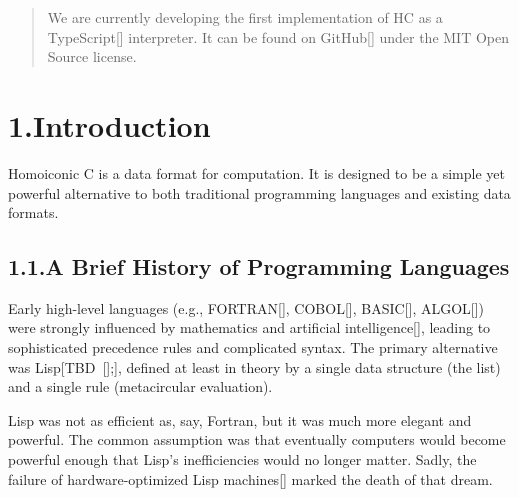 \documentclass[preprint]{{acmart}}
\begin{document}
\begin{abstract}
We are currently developing the first implementation of HC as a
TypeScript[] interpreter. It can be found on GitHub[]
under the MIT Open Source license.%
\end{abstract}%

\section{1.\hspace*{0.5em}Introduction}\label{sec-intro}%

\noindent{}Homoiconic C is a data format for computation. It is designed to be a
simple yet powerful alternative to both traditional programming languages
and existing data formats.%

\subsection{1.1.\hspace*{0.5em}A Brief History of Programming Languages}\label{sec-a-brief-history-of-programming-languages}%

\noindent{}Early high-level languages (e.g., FORTRAN[], COBOL[],
BASIC[], ALGOL[]) were strongly influenced by mathematics and
artificial intelligence[], leading to sophisticated precedence rules
and complicated syntax. The primary alternative was Lisp[TBD~{}[];], defined
\textendash{} at least in theory \textendash{} by a single data structure (the list) and a
single rule (metacircular evaluation).%

Lisp was not as efficient as, say, Fortran, but it was much more elegant
and powerful. The common assumption was that eventually computers would
become powerful enough that Lisp's inefficiencies would no longer matter.
Sadly, the failure of hardware-optimized Lisp machines[] marked the
death of that dream.%
\end{document}
